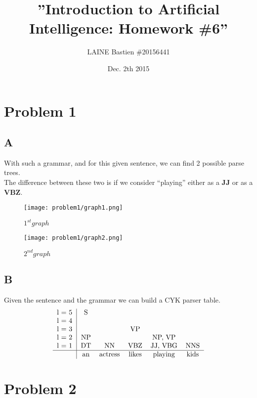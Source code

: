 \documentclass{article}
\begin{document}
\title{\textbf{''Introduction to Artificial Intelligence: Homework \#6''}}
\author{LAINE Bastien \#20156441}
\date{Dec. 2th 2015}
\maketitle
\tableofcontents

\newpage
    \section{Problem 1}
        \subsection{A}
            With such a grammar, and for this given sentence, we can find 2 possible parse trees.\\
            The difference between these two is if we consider ``playing'' either as a \textbf{JJ} or as a \textbf{VBZ}.
            \begin{figure}[H]
                \centering
                \texttt{[image: problem1/graph1.png]}
                \caption{$1^{st} graph$}
            \end{figure}
            \begin{figure}[H]
                \centering
                \texttt{[image: problem1/graph2.png]}
                \caption{$2^{nd} graph$}
            \end{figure}
        \subsection{B}
            Given the sentence and the grammar we can build a CYK parser table.
            \[
                \begin{tabular}{r|ccccccccc}
                    l = 5 & S\\
                    l = 4 &  &\\
                    l = 3 &  &  & VP\\
                    l = 2 & NP &  &  & NP, VP\\
                    l = 1 & DT & NN & VBZ & JJ, VBG & NNS \\
                    \hline
                    & an & actress & likes & playing & kids \\
                \end{tabular}
            \]
    \newpage
    \section{Problem 2}
\end{document}
